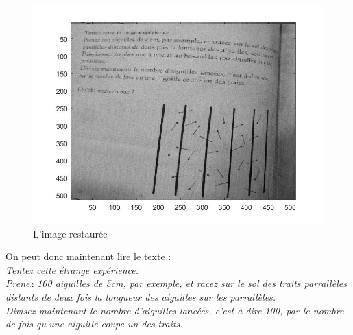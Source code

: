\documentclass[10pt,a4paper]{article}
\begin{document}
\begin{figure}[H]	\begin{center}
\includegraphics[scale=0.35]{im_restauree.jpg}
\caption{L'image restaurée}
\label{XX}
\end{center}	\end{figure}

On peut donc maintenant lire le texte : 
\textit{\\Tentez cette étrange expérience:\\
Prenez 100 aiguilles de 5cm, par exemple, et racez sur le sol des traits parrallèles distants de deux fois la longueur des aiguilles sur les parrallèles.\\
Divisez maintenant le nombre d'aiguilles lancées, c'est à dire 100, par le nombre de fois qu'une aiguille coupe un des traits.}
\end{document}
